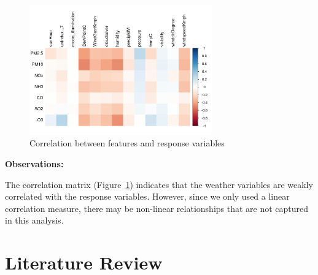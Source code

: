 \documentclass[12pt]{article}
\begin{document}
\begin{figure}[h]
    \centering
    \includegraphics[width=0.7\textwidth]{feature-response-correlation.png}
    \caption{Correlation between features and response variables}
    \label{fig:feature_response_correlation}
\end{figure}

\textbf{Observations:}

The correlation matrix (Figure~\ref{fig:feature_response_correlation}) indicates that the weather variables are weakly correlated with the response variables. However, since we only used a linear correlation measure, there may be non-linear relationships that are not captured in this analysis.






\section{Literature Review}






\newpage

\printbibliography
\end{document}
